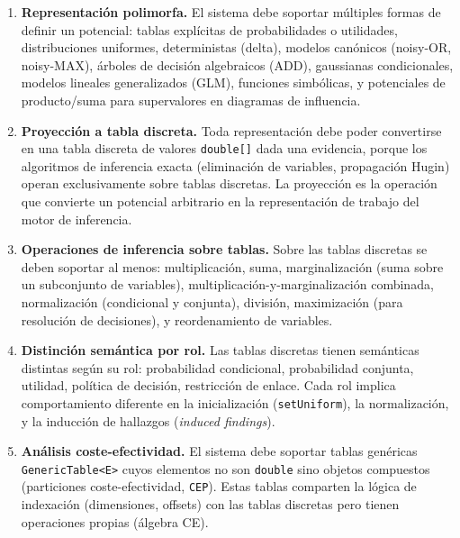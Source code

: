 \documentclass[11pt,a4paper]{article}
\newcommand{\code}[1]{\texttt{#1}}
\begin{document}
\begin{enumerate}[label=\textbf{RF\arabic*}]
  \item \textbf{Representación polimorfa.}
        El sistema debe soportar múltiples formas de definir un potencial:
        tablas explícitas de probabilidades o utilidades, distribuciones
        uniformes, deterministas (delta), modelos canónicos (noisy-OR,
        noisy-MAX), árboles de decisión algebraicos (ADD), gaussianas
        condicionales, modelos lineales generalizados (GLM), funciones
        simbólicas, y potenciales de producto/suma para supervalores en
        diagramas de influencia.
        \label{req:rf1}

  \item \textbf{Proyección a tabla discreta.}
        Toda representación debe poder convertirse en una tabla discreta
        de valores \code{double[]} dada una evidencia, porque los algoritmos
        de inferencia exacta (eliminación de variables, propagación Hugin)
        operan exclusivamente sobre tablas discretas.  La proyección es
        la operación que convierte un potencial arbitrario en la
        representación de trabajo del motor de inferencia.
        \label{req:rf2}

  \item \textbf{Operaciones de inferencia sobre tablas.}
        Sobre las tablas discretas se deben soportar al menos: multiplicación,
        suma, marginalización (suma sobre un subconjunto de variables),
        multiplicación-y-marginalización combinada, normalización (condicional
        y conjunta), división, maximización (para resolución de decisiones),
        y reordenamiento de variables.
        \label{req:rf3}

  \item \textbf{Distinción semántica por rol.}
        Las tablas discretas tienen semánticas distintas según su rol:
        probabilidad condicional, probabilidad conjunta, utilidad, política
        de decisión, restricción de enlace.  Cada rol implica comportamiento
        diferente en la inicialización (\code{setUniform}), la normalización,
        y la inducción de hallazgos (\emph{induced findings}).
        \label{req:rf4}

  \item \textbf{Análisis coste-efectividad.}
        El sistema debe soportar tablas genéricas \code{GenericTable<E>} cuyos
        elementos no son \code{double} sino objetos compuestos (particiones
        coste-efectividad, \code{CEP}).  Estas tablas comparten la lógica de
        indexación (dimensiones, offsets) con las tablas discretas pero tienen
        operaciones propias (álgebra CE).
        \label{req:rf5}


\end{enumerate}
\end{document}

